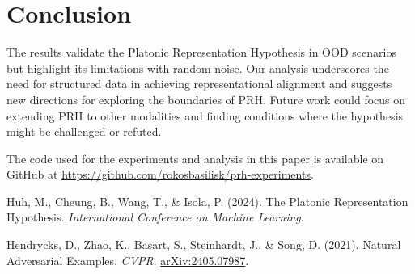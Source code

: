 \documentclass[10pt,a4paper]{article}
\begin{document}
\section{Conclusion}
The results validate the Platonic Representation Hypothesis in OOD scenarios but highlight its limitations with random noise. Our analysis underscores the need for structured data in achieving representational alignment and suggests new directions for exploring the boundaries of PRH. Future work could focus on extending PRH to other modalities and finding conditions where the hypothesis might be challenged or refuted.

\vfill
The code used for the experiments and analysis in this paper is available on GitHub at \href{https://github.com/rokosbasilisk/prh-experiments}{https://github.com/rokosbasilisk/prh-experiments}.

\clearpage
\begin{thebibliography}{9}

Huh, M., Cheung, B., Wang, T., \& Isola, P. (2024). The Platonic Representation Hypothesis. \emph{International Conference on Machine Learning}.

Hendrycks, D., Zhao, K., Basart, S., Steinhardt, J., \& Song, D. (2021). Natural Adversarial Examples. \emph{CVPR}. \href{https://arxiv.org/abs/2405.07987}{arXiv:2405.07987}.

\end{thebibliography}
\end{document}
